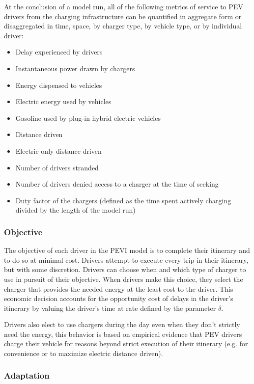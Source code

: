 \documentclass[journal]{IEEEtran}
\begin{document}
At the conclusion of a model run, all of the following metrics of service to PEV drivers from the charging infrastructure can be quantified in aggregate form or disaggregated in time, space, by charger type, by vehicle type, or by individual driver:
\begin{itemize}
  \item	Delay experienced by drivers
  \item	Instantaneous power drawn by chargers
  \item	Energy dispensed to vehicles
  \item	Electric energy used by vehicles
  \item	Gasoline used by plug-in hybrid electric vehicles
  \item	Distance driven
  \item	Electric-only distance driven
  \item	Number of drivers stranded
  \item	Number of drivers denied access to a charger at the time of seeking
  \item	Duty factor of the chargers (defined as the time spent actively charging divided by the length of the model run)
\end{itemize}

\subsubsection{Objective}

The objective of each driver in the PEVI model is to complete their itinerary and to do so at minimal cost. Drivers attempt to execute every trip in their itinerary, but with some discretion.  Drivers can choose when and which type of charger to use in pursuit of their objective.  When drivers make this choice, they select the charger that provides the needed energy at the least cost to the driver.  This economic decision accounts for the opportunity cost of delays in the driver's itinerary by valuing the driver's time at rate defined by the parameter $\delta$.

Drivers also elect to use chargers during the day even when they don't strictly need the energy, this behavior is based on empirical evidence that PEV drivers charge their vehicle for reasons beyond strict execution of their itinerary (e.g. for convenience or to maximize electric distance driven).

\subsubsection{Adaptation}
\end{document}
